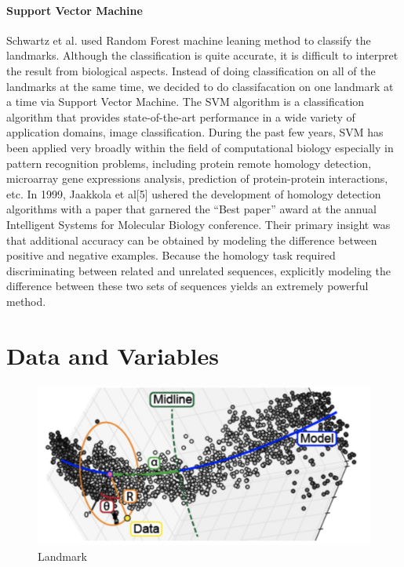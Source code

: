 \documentclass[10pt,letterpaper]{article}
\begin{document}
\paragraph{Support Vector Machine}\label{support-vector-machine}

Schwartz et al. used Random Forest machine leaning method to classify
the landmarks. Although the classification is quite accurate, it is
difficult to interpret the result from biological aspects. Instead of
doing classification on all of the landmarks at the same time, we
decided to do classifacation on one landmark at a time via Support
Vector Machine. The SVM algorithm is a classification algorithm that
provides state-of-the-art performance in a wide variety of application
domains, image classification. During the past few years, SVM has been
applied very broadly within the field of computational biology
especially in pattern recognition problems, including protein remote
homology detection, microarray gene expressions analysis, prediction of
protein-protein interactions, etc. In 1999, Jaakkola et al{[}5{]}
ushered the development of homology detection algorithms with a paper
that garnered the ``Best paper'' award at the annual Intelligent Systems
for Molecular Biology conference. Their primary insight was that
additional accuracy can be obtained by modeling the difference between
positive and negative examples. Because the homology task required
discriminating between related and unrelated sequences, explicitly
modeling the difference between these two sets of sequences yields an
extremely powerful method.

\section{Data and Variables}\label{data-and-variables}

\begin{figure}[h]

{\centering \includegraphics[width=5.55in]{figures/landmark} 

}

\caption{Landmark}\label{fig:landmark}
\end{figure}
\end{document}

